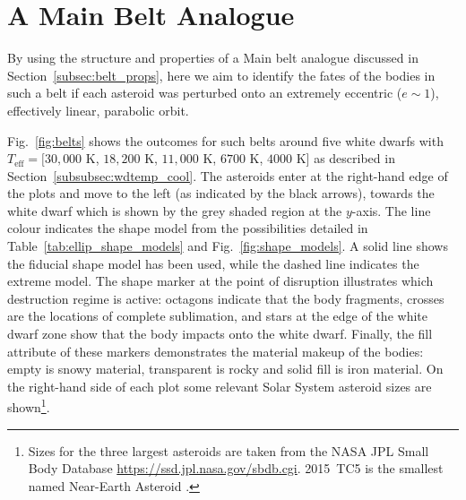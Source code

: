 \documentclass[fleqn,usenatbib]{mnras}
\begin{document}
\section{A Main Belt Analogue} \label{sec:main_belt}
By using the structure and properties of a Main belt analogue discussed in Section~\ref{subsec:belt_props}, here we aim to identify the fates of the bodies in such a belt if each asteroid was perturbed onto an extremely eccentric ($e \sim 1$), effectively linear, parabolic orbit.

Fig.~\ref{fig:belts} shows the outcomes for such belts around five white dwarfs with $T_\text{eff} = [30,000$ K, $18,200$ K, $11,000$ K, $6700$ K, $4000$ K] as described in Section~\ref{subsubsec:wdtemp_cool}.
The asteroids enter at the right-hand edge of the plots and move to the left (as indicated by the black arrows), towards the white dwarf which is shown by the grey shaded region at the $y$-axis.
The line colour indicates the shape model from the possibilities detailed in Table~\ref{tab:ellip_shape_models} and Fig.~\ref{fig:shape_models}.
A solid line shows the fiducial shape model has been used, while the dashed line indicates the extreme model. 
The shape marker at the point of disruption illustrates which destruction regime is active:  octagons indicate that the body fragments, crosses are the locations of complete sublimation, and stars at the edge of the white dwarf zone show that the body impacts onto the white dwarf. 
Finally, the fill attribute of these markers demonstrates the material makeup of the bodies: empty is snowy material, transparent is rocky and solid fill is iron material. 
On the right-hand side of each plot some relevant Solar System asteroid sizes are shown\footnote{Sizes for the three largest asteroids are taken from the NASA JPL Small Body Database \url{https://ssd.jpl.nasa.gov/sbdb.cgi}. 2015~TC5 is the smallest named Near-Earth Asteroid \citep{Reddy2016}.}.
\end{document}
